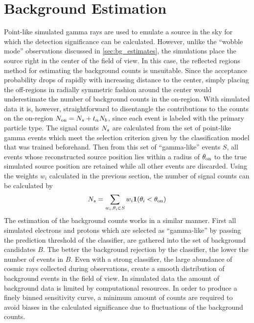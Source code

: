 \section{Background Estimation}
\label{sec:bg_esitmates_mc}
Point-like simulated gamma rays are used to emulate a source in the sky for which the detection significance can be calculated.
However, unlike the \enquote{wobble mode} observations discussed in \cref{sec:bg_estimates}, the simulations place the 
source right in the center of the field of view.
In this case, the reflected regions method for estimating the background counts is unsuitable. 
Since the acceptance probability drops of rapidly with increasing distance to the center, simply placing the off-regions in 
radially symmetric fashion around the center would underestimate the number of background counts in the on-region.
With simulated data it is, however, straightforward to disentangle the 
contributions to the counts on the on-region $N_\text{on} =  N_{s} + t_{\alpha} N_{b}$, since each event is 
labeled with the primary particle type.  
The signal counts $N_{s}$ are calculated from the set of point-like gamma events which meet the selection criterion given
by the classification model that was trained beforehand.
Then from this set of \enquote{gamma-like} events $S$, all events whose reconstructed source position lies within
a radius of $\theta_{\text{on}}$ to the true simulated source position are retained while all other events are discarded. 
Using the weights $w_i$ calculated in the previous section, the number of signal counts can be calculated by 
\begin{equation}
    \label{eq:nsig}
    N_{s} = \sum_{w_i, \theta_i \in S} w_i \mathbf{1}(\theta_i < \theta_{\text{on}})
\end{equation}
The estimation of the background counts works in a similar manner. First all simulated electrons and protons which are 
selected as \enquote{gamma-like} by passing the prediction threshold of the classifier, are gathered into the set of background 
candidates $B$. 
The better the background rejection by the classifier, the lower the number of events 
in $B$. 
Even with a strong classifier, 
the large abundance of cosmic rays collected during observations, create a smooth distribution of background events in the field of view.
In simulated data the amount of background data is limited by computational resources. 
In order to produce a finely binned sensitivity curve, a minimum amount of counts are required to avoid 
biases in the calculated significance due to fluctuations of the background counts.

